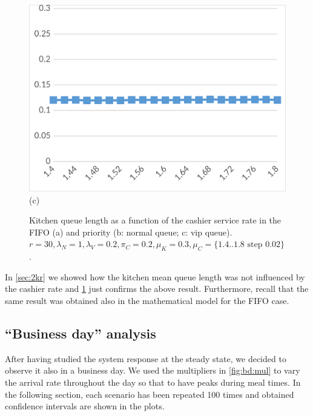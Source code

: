 \begin{figure}[H]
\begin{minipage}{0.32\textwidth}
    \includegraphics[width=\textwidth]{figs/inv_ql_vip.png}
    (c)
  \end{minipage}
  \caption{Kitchen queue length as a function of the cashier service rate in the FIFO (a) and priority (b: normal queue; c: vip queue). 
  $r=30,\lambda_N=1,\lambda_V=0.2,\pi_C=0.2,\mu_K=0.3,\mu_C=\{1.4..1.8 \text{ step } 0.02\}$.}
  \label{fig:inv_ql}
\end{figure}

In \cref{sec:2kr} we showed how the kitchen mean queue length was not influenced by the cashier rate and \cref{fig:inv_ql} just confirms the above result. Furthermore, recall that the same result was obtained also in the mathematical model for the FIFO case.

\subsection{``Business day'' analysis}
After having studied the system response at the steady state, we decided to observe it also in a business day. We used the multipliers in \cref{fig:bd:mul} to vary the arrival rate throughout the day so that to have peaks during meal times. In the following section, each scenario has been repeated 100 times and obtained confidence intervals are shown in the plots.

